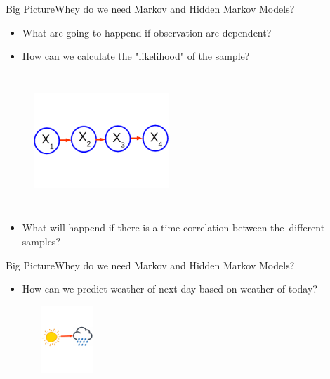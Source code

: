 \documentclass[10pt]{beamer}
\begin{document}
\begin{frame}{Big Picture}{Whey do we need Markov and Hidden Markov Models?}
  \begin{itemize}
    \item What are going to happend if observation are dependent?
    \item How can we calculate the "likelihood" of the sample?
  \end{itemize}
  \begin{figure}[h]
    \centering
    \includegraphics[width=2in,height=2in]{figures/not_idd.png}
  \end{figure}
  \begin{itemize}
    \item What will happend if there is a time correlation between the\
          different samples?\cite{Anders}
  \end{itemize}

\end{frame}

\begin{frame}{Big Picture}{Whey do we need Markov and Hidden Markov Models?}
  \begin{itemize}
    \item How can we predict weather of next day based on weather of today?
  \end{itemize}
  \begin{figure}[h]
    \centering
    \includegraphics[width=1in,height=1in]{figures/sunny_to_rainny.png}
  \end{figure}
\end{frame}
\end{document}
